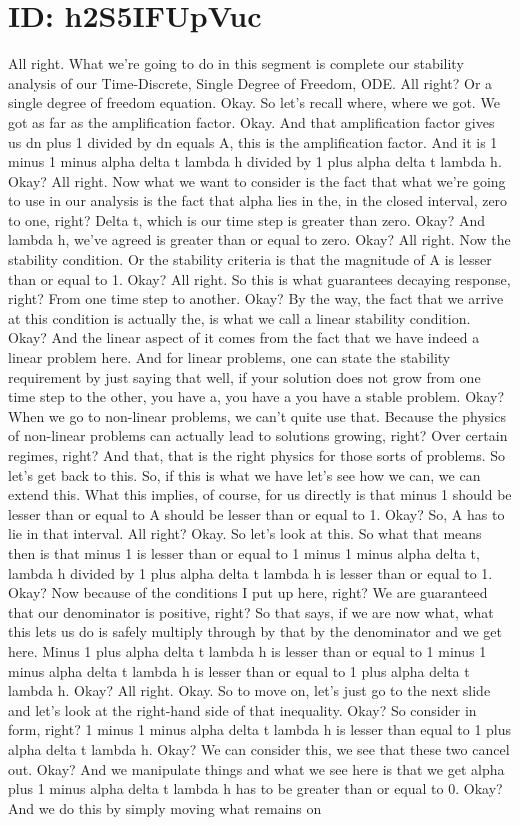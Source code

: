 \documentclass[10pt]{article}
\begin{document}
\section*{ID: h2S5IFUpVuc}
All right. What we're going to do in this segment is complete our stability analysis of our Time-Discrete, Single Degree of Freedom, ODE. All right? Or a single degree of freedom equation. Okay. So let's recall where, where we got. We got as far as the amplification factor. Okay. And that amplification factor gives us dn plus 1 divided by dn equals A, this is the amplification factor. And it is 1 minus 1 minus alpha delta t lambda h divided by 1 plus alpha delta t lambda h. Okay? All right. Now what we want to consider is the fact that what we're going to use in our analysis is the fact that alpha lies in the, in the closed interval, zero to one, right? Delta t, which is our time step is greater than zero. Okay? And lambda h, we've agreed is greater than or equal to zero. Okay? All right. Now the stability condition. Or the stability criteria is that the magnitude of A is lesser than or equal to 1. Okay? All right. So this is what guarantees decaying response, right? From one time step to another. Okay? By the way, the fact that we arrive at this condition is actually the, is what we call a linear stability condition. Okay? And the linear aspect of it comes from the fact that we have indeed a linear problem here. And for linear problems, one can state the stability requirement by just saying that well, if your solution does not grow from one time step to the other, you have a, you have a you have a stable problem. Okay? When we go to non-linear problems, we can't quite use that. Because the physics of non-linear problems can actually lead to solutions growing, right? Over certain regimes, right? And that, that is the right physics for those sorts of problems. So let's get back to this. So, if this is what we have let's see how we can, we can extend this. What this implies, of course, for us directly is that minus 1 should be lesser than or equal to A should be lesser than or equal to 1. Okay? So, A has to lie in that interval. All right? Okay. So let's look at this. So what that means then is that minus 1 is lesser than or equal to 1 minus 1 minus alpha delta t, lambda h divided by 1 plus alpha delta t lambda h is lesser than or equal to 1. Okay? Now because of the conditions I put up here, right? We are guaranteed that our denominator is positive, right? So that says, if we are now what, what this lets us do is safely multiply through by that by the denominator and we get here. Minus 1 plus alpha delta t lambda h is lesser than or equal to 1 minus 1 minus alpha delta t lambda h is lesser than or equal to 1 plus alpha delta t lambda h. Okay? All right. Okay. So to move on, let's just go to the next slide and let's look at the right-hand side of that inequality. Okay? So consider in form, right? 1 minus 1 minus alpha delta t lambda h is lesser than equal to 1 plus alpha delta t lambda h. Okay? We can consider this, we see that these two cancel out. Okay? And we manipulate things and what we see here is that we get alpha plus 1 minus alpha delta t lambda h has to be greater than or equal to 0. Okay? And we do this by simply moving what remains on 
\end{document}
